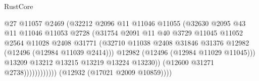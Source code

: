 \begin{lexlean}{RustCore}
\begin{coremodule}
                                                @27
                                                @11057
                                                @2469
                                                (@32212
                                                  @2096
                                                  @11
                                                  @11046
                                                  @11055
                                                  (@32630
                                                    @2095
                                                    @43
                                                    @11
                                                    @11046
                                                    @11053
                                                    @2728
                                                    (@31754
                                                      @2091
                                                      @11
                                                      @40
                                                      @3729
                                                      @11045
                                                      @11052
                                                      @2564
                                                      @11028
                                                      @2408
                                                      @31771
                                                      (@32710
                                                        @11038
                                                        @2408
                                                        @31846
                                                        @31376
                                                        @12982
                                                        (@12496 (@12984 @11039 @2414)))
                                                      @12982
                                                      (@12496 (@12984 @11029 @11045)))
                                                    @13209
                                                    @13212
                                                    @13215
                                                    @13219
                                                    @13224
                                                    @13230))
                                                (@12600 @31271 @2738))))))))))))
                          (@12932 (@17021 @2009 @10859))))

\end{coremodule}
\end{lexlean}
